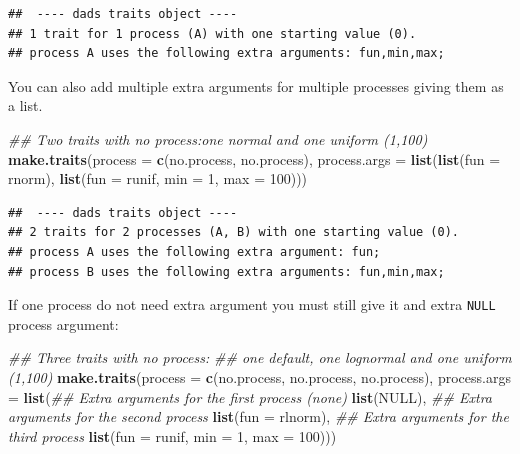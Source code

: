 \documentclass[]{book}
\newenvironment{Shaded}{\begin{snugshade}}{\end{snugshade}}
\newcommand{\CommentTok}[1]{\textcolor[rgb]{0.56,0.35,0.01}{\textit{#1}}}
\newcommand{\DataTypeTok}[1]{\textcolor[rgb]{0.13,0.29,0.53}{#1}}
\newcommand{\DecValTok}[1]{\textcolor[rgb]{0.00,0.00,0.81}{#1}}
\newcommand{\KeywordTok}[1]{\textcolor[rgb]{0.13,0.29,0.53}{\textbf{#1}}}
\newcommand{\NormalTok}[1]{#1}
\newcommand{\OtherTok}[1]{\textcolor[rgb]{0.56,0.35,0.01}{#1}}
\begin{document}
\begin{verbatim}
##  ---- dads traits object ---- 
## 1 trait for 1 process (A) with one starting value (0).
## process A uses the following extra arguments: fun,min,max;
\end{verbatim}

You can also add multiple extra arguments for multiple processes giving them as a list.

\begin{Shaded}
\begin{Highlighting}[]
\CommentTok{## Two traits with no process:one normal and one uniform (1,100)}
\KeywordTok{make.traits}\NormalTok{(}\DataTypeTok{process      =} \KeywordTok{c}\NormalTok{(no.process, no.process),}
            \DataTypeTok{process.args =} \KeywordTok{list}\NormalTok{(}\KeywordTok{list}\NormalTok{(}\DataTypeTok{fun =}\NormalTok{ rnorm),}
                                \KeywordTok{list}\NormalTok{(}\DataTypeTok{fun =}\NormalTok{ runif, }\DataTypeTok{min =} \DecValTok{1}\NormalTok{, }\DataTypeTok{max =} \DecValTok{100}\NormalTok{)))}
\end{Highlighting}
\end{Shaded}

\begin{verbatim}
##  ---- dads traits object ---- 
## 2 traits for 2 processes (A, B) with one starting value (0).
## process A uses the following extra argument: fun;
## process B uses the following extra arguments: fun,min,max;
\end{verbatim}

If one process do not need extra argument you must still give it and extra \texttt{NULL} process argument:

\begin{Shaded}
\begin{Highlighting}[]
\CommentTok{## Three traits with no process:}
\CommentTok{## one default, one lognormal and one uniform (1,100)}
\KeywordTok{make.traits}\NormalTok{(}\DataTypeTok{process      =} \KeywordTok{c}\NormalTok{(no.process, no.process, no.process),}
            \DataTypeTok{process.args =} \KeywordTok{list}\NormalTok{(}\CommentTok{## Extra arguments for the first process (none)}
                                \KeywordTok{list}\NormalTok{(}\OtherTok{NULL}\NormalTok{),}
                                \CommentTok{## Extra arguments for the second process}
                                \KeywordTok{list}\NormalTok{(}\DataTypeTok{fun =}\NormalTok{ rlnorm),}
                                \CommentTok{## Extra arguments for the third process}
                                \KeywordTok{list}\NormalTok{(}\DataTypeTok{fun =}\NormalTok{ runif, }\DataTypeTok{min =} \DecValTok{1}\NormalTok{, }\DataTypeTok{max =} \DecValTok{100}\NormalTok{)))}
\end{Highlighting}
\end{Shaded}
\end{document}
